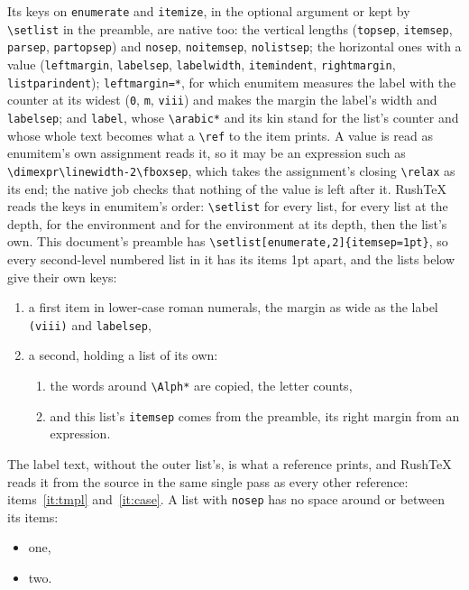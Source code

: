 \documentclass{article}
\numberwithin{equation}{section}
\theoremstyle{definition}
\theoremstyle{remark}
\begin{document}
Its keys on \texttt{enumerate} and \texttt{itemize}, in the optional argument or kept by
\texttt{\textbackslash setlist} in the preamble, are native too: the vertical lengths
(\texttt{topsep}, \texttt{itemsep}, \texttt{parsep}, \texttt{partopsep}) and
\texttt{nosep}, \texttt{noitemsep}, \texttt{nolistsep}; the horizontal ones with a value
(\texttt{leftmargin}, \texttt{labelsep}, \texttt{labelwidth}, \texttt{itemindent},
\texttt{rightmargin}, \texttt{listparindent}); \texttt{leftmargin=*}, for which enumitem
measures the label with the counter at its widest (\texttt{0}, \texttt{m}, \texttt{viii})
and makes the margin the label's width and \texttt{labelsep}; and \texttt{label}, whose
\texttt{\textbackslash arabic*} and its kin stand for the list's counter and whose whole
text becomes what a \texttt{\textbackslash ref} to the item prints. A value is read as
enumitem's own assignment reads it, so it may be an expression such as
\texttt{\textbackslash dimexpr\textbackslash linewidth-2\textbackslash fboxsep}, which
takes the assignment's closing \texttt{\textbackslash relax} as its end; the native job checks
that nothing of the value is left after it. RushTeX reads the keys
in enumitem's order: \texttt{\textbackslash setlist} for every list, for every list at the
depth, for the environment and for the environment at its depth, then the list's own. This
document's preamble has \texttt{\textbackslash setlist[enumerate,2]\{itemsep=1pt\}}, so
every second-level numbered list in it has its items 1pt apart, and the lists below give
their own keys:
\begin{enumerate}[label=(\roman*), leftmargin=*]
  \item a first item in lower-case roman numerals, the margin as wide as the label
    \texttt{(viii)} and \texttt{labelsep},\label{it:tmpl}
  \item a second, holding a list of its own:
    \begin{enumerate}[label=Case \Alph*:, topsep=2pt, rightmargin=\dimexpr 2\fboxsep+1pt]
      \item the words around \texttt{\textbackslash Alph*} are copied, the letter counts,\label{it:case}
      \item and this list's \texttt{itemsep} comes from the preamble, its right margin
        from an expression.
    \end{enumerate}
\end{enumerate}
The label text, without the outer list's, is what a reference prints, and RushTeX reads
it from the source in the same single pass as every other reference: items~\ref{it:tmpl} and~\ref{it:case}. A list
with \texttt{nosep} has no space around or between its items:
\begin{itemize}[nosep]
  \item one,
  \item two.
\end{itemize}
\end{document}
